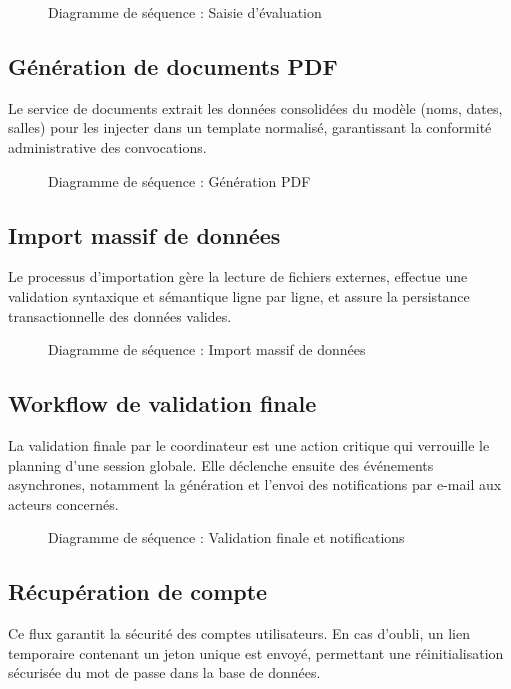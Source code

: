 \documentclass[12pt,a4paper]{article}
\begin{document}
\begin{figure}[H]
    \centering
    \caption{Diagramme de séquence : Saisie d'évaluation}
\end{figure}

\subsection{Génération de documents PDF}
Le service de documents extrait les données consolidées du modèle (noms, dates, salles) pour les injecter dans un template normalisé, garantissant la conformité administrative des convocations.

\begin{figure}[H]
    \centering
    \caption{Diagramme de séquence : Génération PDF}
\end{figure}

\subsection{Import massif de données}
Le processus d'importation gère la lecture de fichiers externes, effectue une validation syntaxique et sémantique ligne par ligne, et assure la persistance transactionnelle des données valides.

\begin{figure}[H]
    \centering
    \caption{Diagramme de séquence : Import massif de données}
\end{figure}

\subsection{Workflow de validation finale}
La validation finale par le coordinateur est une action critique qui verrouille
le planning d'une session globale. Elle déclenche ensuite des événements
asynchrones, notamment la génération et l'envoi des notifications par e-mail aux
acteurs concernés.

\begin{figure}[H]
    \centering
    \caption{Diagramme de séquence : Validation finale et notifications}
\end{figure}

\subsection{Récupération de compte}
Ce flux garantit la sécurité des comptes utilisateurs. En cas d'oubli, un lien temporaire contenant un jeton unique est envoyé, permettant une réinitialisation sécurisée du mot de passe dans la base de données.
\end{document}
